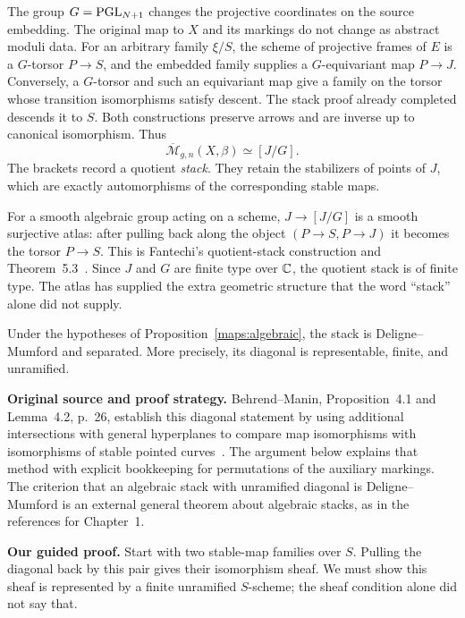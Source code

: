 The group $G=\operatorname{PGL}_{N+1}$ changes the projective coordinates on the source embedding. The original map to $X$ and its markings do not change as abstract moduli data. For an arbitrary family $\xi/S$, the scheme of projective frames of $E$ is a $G$-torsor $P\to S$, and the embedded family supplies a $G$-equivariant map $P\to J$. Conversely, a $G$-torsor and such an equivariant map give a family on the torsor whose transition isomorphisms satisfy descent. The stack proof already completed descends it to $S$. Both constructions preserve arrows and are inverse up to canonical isomorphism. Thus
\[
 \overline{\mathcal M}_{g,n}(X,\beta)\simeq[J/G].
\]
The brackets record a quotient \emph{stack}. They retain the stabilizers of points of $J$, which are exactly automorphisms of the corresponding stable maps.

For a smooth algebraic group acting on a scheme, $J\to[J/G]$ is a smooth surjective atlas: after pulling back along the object $(P\to S,P\to J)$ it becomes the torsor $P\to S$. This is Fantechi's quotient-stack construction and Theorem~5.3~\cite{Fantechi}. Since $J$ and $G$ are finite type over $\mathbb C$, the quotient stack is of finite type. The atlas has supplied the extra geometric structure that the word ``stack'' alone did not supply.

\begin{Prop}\label{maps:dm}
Under the hypotheses of Proposition~\ref{maps:algebraic}, the stack is Deligne--Mumford and separated. More precisely, its diagonal is representable, finite, and unramified.
\end{Prop}

\noindent\textbf{Original source and proof strategy.}
Behrend--Manin, Proposition~4.1 and Lemma~4.2, p.~26, establish this diagonal statement by using additional intersections with general hyperplanes to compare map isomorphisms with isomorphisms of stable pointed curves~\cite{BM}. The argument below explains that method with explicit bookkeeping for permutations of the auxiliary markings. The criterion that an algebraic stack with unramified diagonal is Deligne--Mumford is an external general theorem about algebraic stacks, as in the references for Chapter~1.

\noindent\textbf{Our guided proof.}
Start with two stable-map families over $S$. Pulling the diagonal back by this pair gives their isomorphism sheaf. We must show this sheaf is represented by a finite unramified $S$-scheme; the sheaf condition alone did not say that.

